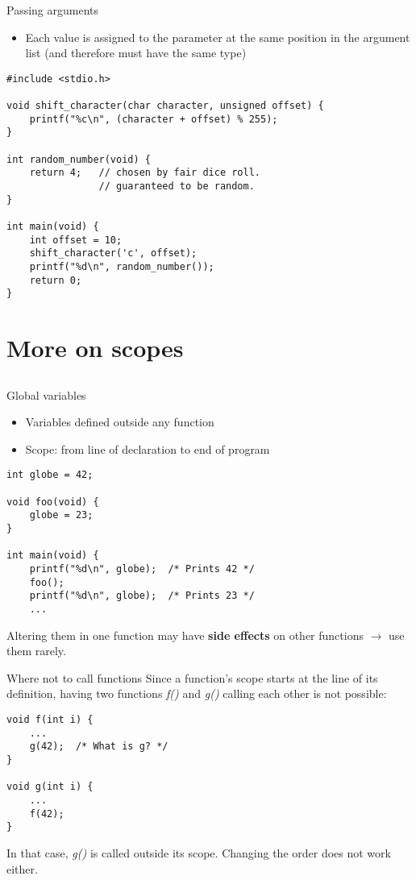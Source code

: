 \begin{frame}[fragile]{Passing arguments}
	\begin{itemize}
		\item Each value is assigned to the parameter at the same position in the argument list (and therefore must have the same type)
	\end{itemize}		
	\begin{lstlisting}[basicstyle=\scriptsize]
#include <stdio.h>	
	
void shift_character(char character, unsigned offset) {
	printf("%c\n", (character + offset) % 255);
}

int random_number(void) {
	return 4;	// chosen by fair dice roll.
				// guaranteed to be random.
}

int main(void) {
	int offset = 10;
	shift_character('c', offset);
	printf("%d\n", random_number());
	return 0;
}
\end{lstlisting}
\end{frame}

\section{More on scopes}
\subsection{}
\begin{frame}[fragile]{Global variables}
	\begin{itemize}
		\item Variables defined outside any function
		\item Scope: from line of declaration to end of program
	\end{itemize}
	\begin{lstlisting}
int globe = 42;

void foo(void) {
	globe = 23;
}

int main(void) {
	printf("%d\n", globe);	/* Prints 42 */
	foo();
	printf("%d\n", globe);	/* Prints 23 */
	...
\end{lstlisting}
	Altering them in one function may have \textbf{side effects} on other functions $\rightarrow$ use them rarely.
\end{frame}
\begin{frame}[fragile]{Where not to call functions}
	Since a function's scope starts at the line of its definition, having two functions \textit{f()} and \textit{g()} calling each other is not possible:
	\begin{lstlisting}
void f(int i) {
	...
	g(42);	/* What is g? */
}

void g(int i) {
	...
	f(42);
}
\end{lstlisting}
	In that case, \textit{g()} is called outside its scope. Changing the order does not work either.
\end{frame}

